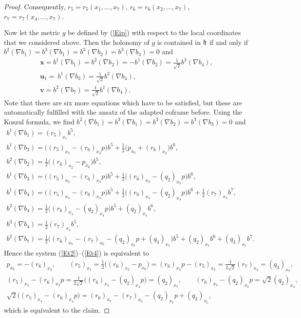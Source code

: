 \documentclass[11pt]{article}
\numberwithin{equation}{section}
\newcommand\fh{{\frak h}}
\newcommand\bx{{\mathbf x}}
\newcommand\bu{{\mathbf u}}
\newcommand\bv{{\mathbf v}}
\begin{document}
\begin{proof}
Consequently, $r_5=r_5(x_1,\dots,x_7)$, $r_6=r_6(x_2,\dots,x_7)$, $r_7=r_7(x_4,\dots,x_7)$.

Now let the metric $g$ be defined by (\ref{Eip}) with respect to the local coordinates that we considered above. Then the holonomy of $g$ is contained in $\fh$ if and only if $b^2(\nabla b_{1})=b^3(\nabla b_{1})=b^3(\nabla b_{2})=b^3(\nabla b_{3})=0$ and
\begin{gather}
\bx=b^1(\nabla b_1)=b^2(\nabla b_2)=-b^1(\nabla b_2)= \tfrac1{\sqrt2} b^3(\nabla b_4), \label{Et2}\\
\bu_1=\ b^1(\nabla b_3)= \tfrac 1{\sqrt2}b^2(\nabla b_4), \\
\bv= b^2(\nabla b_7)= \tfrac 1{\sqrt2}b^1(\nabla b_4). \label{Et4}
\end{gather}
Note that there are six more equations which have to be satisfied, but these are automatically fulfilled with the ansatz of the adapted coframe before. Using the Koszul formula, we find $b^2(\nabla b_{1})=b^3(\nabla b_{1})=b^3(\nabla b_{2})=b^3(\nabla b_{3})=0$ and
\begin{gather*}
b^1(\nabla b_1) = (r_5)_{x_1} b^5, \\
b^1(\nabla b_2) = \big((r_5)_{x_2} -(r_6)_{x_2}p\big)b^5 + \tfrac12 \big(p_{x_6}+(r_6)_{x_2}\big) b^6, \\
b^{2}(\nabla b_{2})= \tfrac12\big((r_6)_{x_2}- p_{x_6}\big) b^5, \\
b^1(\nabla b_3)= \big((r_5)_{x_3} -(r_6)_{x_3}p\big)b^5 +\tfrac12\big((r_6)_{x_3}- (q_2)_{x_3}p\big) b^6 , \\
b^1(\nabla b_4) = \big( (r_5)_{x_4}-(r_6)_{x_4} p\big)b^5 +\tfrac12\big((r_6)_{x_4}-(q_2)_{x_4} p\big) b^6 +\frac12 (r_7)_{x_4}b^7 , \\
b^2(\nabla b_4) = \tfrac12\big((r_6)_{x_4}-(q_2)_{x_4}p\big) b^5 +(q_2)_{x_4}b^6 , \\
b^3(\nabla b_4) = \tfrac12 (r_7)_{x_4}b^5 , \\
b^2(\nabla b_7)= \tfrac12 \big((r_6)_{x_7}-(r_7)_{x_6} -(q_2)_{x_7} p+(q_3)_{x_5}\big)b^5 +(q_2)_{x_7}b^6+(q_3)_{x_7}b^7.
\end{gather*}
Hence the system (\ref{Et2})--(\ref{Et4}) is equivalent to
\begin{gather*}
 p_{x_6}=-(r_6)_{x_2},\qquad
(r_5)_{x_1} =\tfrac12\big((r_6)_{x_2}- p_{x_6}\big) =(r_6)_{x_2}p-(r_5)_{x_2}=\tfrac 1{2\sqrt2}(r_7)_{x_4}=(q_3)_{x_7},\\
(r_5)_{x_3} -(r_6)_{x_3}p= \tfrac1{2\sqrt 2}\big((r_6)_{x_4}-(q_2)_{x_4}p\big)=(q_2)_{x_7},\qquad
 (r_6)_{x_3}- (q_2)_{x_3}p= {\sqrt2}(q_2)_{x_4},\\
\sqrt2 \big( (r_5)_{x_4}-(r_6)_{x_4} p\big)=(r_6)_{x_7}-(r_7)_{x_6} -(q_2)_{x_7} p+(q_3)_{x_5},
\end{gather*}
which is equivalent to the claim. \end{proof}
\end{document}
